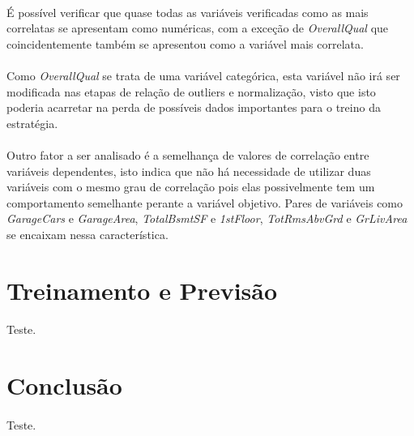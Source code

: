 \documentclass{article}
\begin{document}
		\paragraph{}É possível verificar que quase todas as variáveis verificadas como as mais correlatas se apresentam como numéricas, com a exceção de \textit{OverallQual} que coincidentemente também se apresentou como a variável mais correlata.
		
		\paragraph{}Como \textit{OverallQual} se trata de uma variável categórica, esta variável não irá ser modificada nas etapas de relação de outliers e normalização, visto que isto poderia acarretar na perda de possíveis dados importantes para o treino da estratégia.
		
		\paragraph{}Outro fator a ser analisado é a semelhança de valores de correlação entre variáveis dependentes, isto indica que não há necessidade de utilizar duas variáveis com o mesmo grau de correlação pois elas possivelmente tem um comportamento semelhante perante a variável objetivo. Pares de variáveis como \textit{GarageCars} e \textit{GarageArea}, \textit{TotalBsmtSF} e \textit{1stFloor}, \textit{TotRmsAbvGrd} e \textit{GrLivArea} se encaixam nessa característica.
		
\section{Treinamento e Previsão}
	\paragraph{}Teste.
	
\section{Conclusão}

	\paragraph{}Teste.
\end{document}
